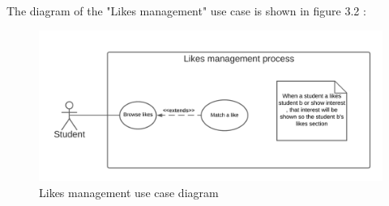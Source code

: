 The diagram of the "Likes management" use case is shown in figure 3.2 :

\begin{figure}[H] 
            \centering
            \includegraphics[scale=0.8]{diagrams/likes management use case.png}
            \caption{Likes management use case diagram} 
            \label{fig: Likes management use case diagram}
\end{figure}

